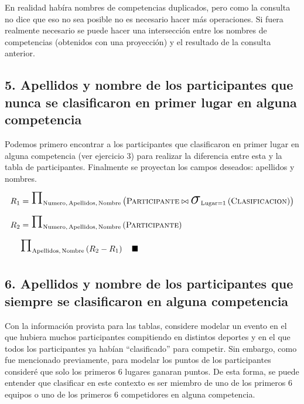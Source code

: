 \documentclass[a4paper, twoside, 12pt]{article}
\newcommand{\tblstr}[1]{\mathrm{\textsc{#1}}}
\newcommand{\select}[4]{\makebox{\huge\ensuremath{\sigma}}_{\mathrm{#1} #2 #3}\left( #4 \right)}
\newcommand{\project}[2]{\makebox{\huge\ensuremath{\Pi}}_{\mathrm{#1}} \left( #2 \right)}
\newcommand{\concat}[2]{#1 \bowtie #2}
\begin{document}
En realidad habíra nombres de competencias duplicados, pero como la consulta no dice que eso no sea posible no es necesario hacer más operaciones. Si fuera realmente necesario se puede hacer una intersección entre los nombres de competencias (obtenidos con una proyección) y el resultado de la consulta anterior.

\subsection*{5. Apellidos y nombre de los participantes que nunca se clasificaron en primer lugar en alguna competencia}

Podemos primero encontrar a los participantes que clasificaron en primer lugar en alguna competencia (ver ejercicio 3) para realizar la diferencia entre esta y la tabla de participantes. Finalmente se proyectan los campos deseados: apellidos y nombres.
\vspace{-14pt}
\begin{equation*}
\begin{split}
R_{1} &= \project
    {\mathrm{Numero,\, Apellidos,\, Nombre}}
    {\concat
        {\tblstr{Participante}}
        {\select
            {Lugar}
            {=}
            {1}
            {\tblstr{Clasificacion}}}}\\
R_{2} &= 
    \project
        {\mathrm{Numero,\, Apellidos,\, Nombre}}
        {\tblstr{Participante}}\\
& \project
    {\mathrm{Apellidos,\, Nombre}}
    {R_{2} - R_{1}} 
  \quad\blacksquare
\end{split}
\end{equation*}

\subsection*{6. Apellidos y nombre de los participantes que siempre se clasificaron en alguna competencia}

Con la información provista para las tablas, considere modelar un evento en el que hubiera muchos participantes compitiendo en distintos deportes y en el que todos los participantes ya habían ``clasificado'' para competir. Sin embargo, como fue mencionado previamente, para modelar los puntos de los participantes consideré que solo los primeros 6 lugares ganaran puntos. De esta forma, se puede entender que clasificar en este contexto es ser miembro de uno de los primeros 6 equipos o uno de los primeros 6 competidores en alguna competencia.
\end{document}
